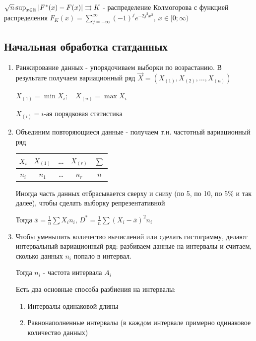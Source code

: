 \documentclass[12pt]{article}
\begin{document}
\begin{MyTheorem}
     $\sqrt{n} \sup_{x \in \mathbb{R}} |F^*(x) - F(x)| \rightrightarrows K$ - распределение Колмогорова с 
    функцией распределения $F_K(x) = \sum_{j = -\infty}^{\infty} (-1)^j e^{-2 j^2 x^2}, \ x \in [0;\infty)$
\end{MyTheorem}

\hypertarget{initial_data_processing}{}

\subsection{Начальная обработка статданных}

\begin{enumerate}
    \item Ранжирование данных - упорядочиваем выборки по возрастанию. В результате получаем вариационный ряд $\vec{X} = (X_{(1)}, X_{(2)}, \dots, X_{(n)})$

    $X_{(1)} = \min X_i; \quad X_{(n)} = \max X_i$

    $X_{(i)} = i$-ая порядковая статистика

    \item Объединим повторяющиеся данные - получаем т.н. частотный вариационный ряд

    \begin{tabular}{c|c|c|c|c}
        $X_i$ & $X_{(1)}$ & \dots & $X_{(r)}$ & $\sum$ \\ 
        \hline
        $n_i$ & $n_1$ & \dots & $n_r$ & $n$ \\ 
    \end{tabular}

    Иногда часть данных отбрасывается сверху и снизу (по 5, по 10, по 5\% и так далее), чтобы сделать выборку репрезентативной

    Тогда $\overline{x} = \frac{1}{n} \sum X_i n_i$, $D^* = \frac{1}{n} \sum (X_i - \overline{x})^2 n_i$
    
    \item Чтобы уменьшить количество вычислений или сделать гистограмму, делают интервальный вариационный ряд: 
    разбиваем данные на интервалы и считаем, сколько данных $n_i$ попало в интервал. 

    Тогда $n_i$ - частота интервала $A_i$

    Есть два основные способа разбиения на интервалы: 

    \begin{enumerate}
        \item Интервалы одинаковой длины
        \item Равнонаполненные интервалы (в каждом интервале примерно одинаковое количество данных)
    \end{enumerate}


\end{enumerate}
\end{document}
